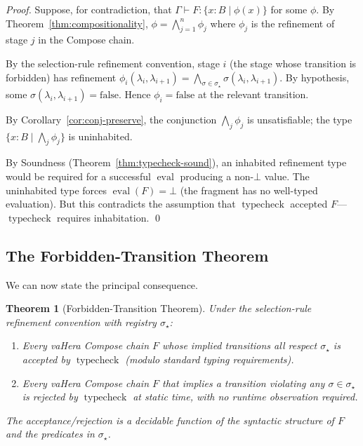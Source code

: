 \documentclass[twocolumn,11pt,a4paper]{article}
\newtheorem{theorem}{Theorem}[section]
\DeclareMathOperator{\typecheck}{typecheck}
\DeclareMathOperator{\eval}{eval}
\newcommand{\Sel}{\sigma}
\newcommand{\Frag}{F}
\newcommand{\Ctx}{\Gamma}
\begin{document}
\begin{proof}
Suppose, for contradiction, that $\Ctx \vdash \Frag : \{x : B \mid \phi(x)\}$ for some $\phi$. By Theorem~\ref{thm:compositionality}, $\phi = \bigwedge_{j=1}^n \phi_j$ where $\phi_j$ is the refinement of stage $j$ in the Compose chain.

By the selection-rule refinement convention, stage $i$ (the stage whose transition is forbidden) has refinement $\phi_i(\lambda_i, \lambda_{i+1}) = \bigwedge_{\Sel \in \Sel_\star} \Sel(\lambda_i, \lambda_{i+1})$. By hypothesis, some $\Sel(\lambda_i, \lambda_{i+1}) = \mathrm{false}$. Hence $\phi_i = \mathrm{false}$ at the relevant transition.

By Corollary~\ref{cor:conj-preserve}, the conjunction $\bigwedge_j \phi_j$ is unsatisfiable; the type $\{x : B \mid \bigwedge_j \phi_j\}$ is uninhabited.

By Soundness (Theorem~\ref{thm:typecheck-sound}), an inhabited refinement type would be required for a successful $\eval$ producing a non-$\bot$ value. The uninhabited type forces $\eval(\Frag) = \bot$ (the fragment has no well-typed evaluation). But this contradicts the assumption that $\typecheck$ accepted $\Frag$---$\typecheck$ requires inhabitation. \qed
\end{proof}

\subsection{The Forbidden-Transition Theorem}

We can now state the principal consequence.

\begin{theorem}[Forbidden-Transition Theorem]
\label{thm:forbidden-transition}
Under the selection-rule refinement convention with registry $\Sel_\star$:
\begin{enumerate}[nosep,leftmargin=*]
\item Every vaHera Compose chain $\Frag$ whose implied transitions all respect $\Sel_\star$ is accepted by $\typecheck$ (modulo standard typing requirements).
\item Every vaHera Compose chain $\Frag$ that implies a transition violating any $\Sel \in \Sel_\star$ is rejected by $\typecheck$ at static time, with no runtime observation required.
\end{enumerate}
The acceptance/rejection is a decidable function of the syntactic structure of $\Frag$ and the predicates in $\Sel_\star$.
\end{theorem}
\end{document}
